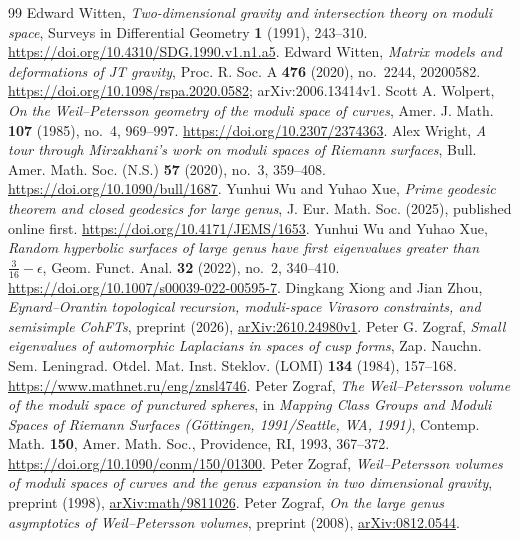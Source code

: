 \begin{thebibliography}{99}
 Edward Witten, \emph{Two-dimensional gravity and intersection theory on moduli space}, Surveys in Differential Geometry \textbf{1} (1991), 243--310. \url{https://doi.org/10.4310/SDG.1990.v1.n1.a5}.
 Edward Witten, \emph{Matrix models and deformations of JT gravity}, Proc. R. Soc. A \textbf{476} (2020), no.~2244, 20200582. \url{https://doi.org/10.1098/rspa.2020.0582}; arXiv:2006.13414v1.
 Scott A. Wolpert, \emph{On the Weil--Petersson geometry of the moduli space of curves}, Amer. J. Math. \textbf{107} (1985), no.~4, 969--997. \url{https://doi.org/10.2307/2374363}.
 Alex Wright, \emph{A tour through Mirzakhani's work on moduli spaces of Riemann surfaces}, Bull. Amer. Math. Soc. (N.S.) \textbf{57} (2020), no.~3, 359--408. \url{https://doi.org/10.1090/bull/1687}.
 Yunhui Wu and Yuhao Xue, \emph{Prime geodesic theorem and closed geodesics for large genus}, J. Eur. Math. Soc. (2025), published online first. \url{https://doi.org/10.4171/JEMS/1653}.
 Yunhui Wu and Yuhao Xue, \emph{Random hyperbolic surfaces of large genus have first eigenvalues greater than $\frac{3}{16}-\epsilon$}, Geom. Funct. Anal. \textbf{32} (2022), no.~2, 340--410. \url{https://doi.org/10.1007/s00039-022-00595-7}.
 Dingkang Xiong and Jian Zhou, \emph{Eynard--Orantin topological recursion, moduli-space Virasoro constraints, and semisimple CohFTs}, preprint (2026), \href{https://arxiv.org/abs/2610.24980v1}{arXiv:2610.24980v1}.
 Peter G. Zograf, \emph{Small eigenvalues of automorphic Laplacians in spaces of cusp forms}, Zap. Nauchn. Sem. Leningrad. Otdel. Mat. Inst. Steklov. (LOMI) \textbf{134} (1984), 157--168. \url{https://www.mathnet.ru/eng/znsl4746}.
 Peter Zograf, \emph{The Weil--Petersson volume of the moduli space of punctured spheres}, in \emph{Mapping Class Groups and Moduli Spaces of Riemann Surfaces (G\"ottingen, 1991/Seattle, WA, 1991)}, Contemp. Math. \textbf{150}, Amer. Math. Soc., Providence, RI, 1993, 367--372. \url{https://doi.org/10.1090/conm/150/01300}.
 Peter Zograf, \emph{Weil--Petersson volumes of moduli spaces of curves and the genus expansion in two dimensional gravity}, preprint (1998), \href{https://arxiv.org/abs/math/9811026}{arXiv:math/9811026}.
 Peter Zograf, \emph{On the large genus asymptotics of Weil--Petersson volumes}, preprint (2008), \href{https://arxiv.org/abs/0812.0544}{arXiv:0812.0544}.
\end{thebibliography}
